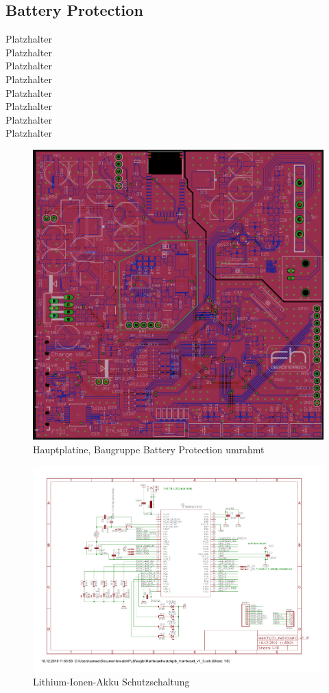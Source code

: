 \documentclass[a4paper]{scrartcl}
\begin{document}
\subsection{Battery Protection}

Platzhalter\\Platzhalter\\Platzhalter\\Platzhalter\\Platzhalter\\Platzhalter\\
Platzhalter\\Platzhalter

\begin{figure}[H]\centering
\includegraphics[page=1, angle=0, width=\linewidth]{../Documentation/pics/mainboard_batprot.png}
\caption{Hauptplatine, Baugruppe Battery Protection umrahmt}
\end{figure}

\begin{figure}[H]\centering
\includegraphics[page=7, angle=90, width=\linewidth]{../eagle/Mainboard/watchplb_mainboard_v1_0.pdf}
\caption{Lithium-Ionen-Akku Schutzschaltung}
\end{figure}
\end{document}
